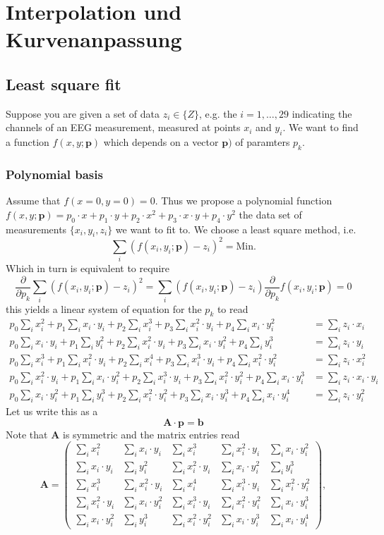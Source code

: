 \chapter{Interpolation und Kurvenanpassung}

\section{Least square fit}
Suppose you are given a set of data $z_i\in\{Z\}$, e.g. the $i=1,\dots,29$ indicating the channels of an EEG measurement, measured at points $x_i$ and $y_i$. We want to find a function $f(x,y;\mathbf{p})$ which depends on a vector $\mathbf{p})$ of paramters $p_k$. 
\subsection{Polynomial basis}
Assume that $f(x=0,y=0)=0$. Thus we propose a polynomial function $f(x,y;\mathbf{p})=p_0\cdot x+p_1\cdot y+p_2\cdot x^2+p_3\cdot x\cdot y+p_4\cdot y^2$ the data set of measurements $\{x_i,y_i,z_i\}$ we want to fit to. We choose a least square method, i.e.
\[
\sum_i \left( f(x_i,y_i;\mathbf{p})-z_i\right)^2 = \text{Min}.
\]
Which in turn is equivalent to require
\[
\frac{\partial}{\partial p_k}\sum_i \left( f(x_i,y_i;\mathbf{p})-z_i\right)^2=\sum_i \left( f(x_i,y_i;\mathbf{p})-z_i\right)\frac{\partial}{\partial p_k}f(x_i,y_i;\mathbf{p})=0
\]
this yields a linear system of equation for the $p_k$ to read
\begin{align*}
p_0\sum_i x_i^2+p_1\sum_i x_i\cdot y_i+p_2\sum_i x_i^3+p_3\sum_i x_i^2\cdot y_i+p_4\sum_i x_i\cdot y_i^2&=\sum_iz_i\cdot x_i\\
p_0\sum_i x_i\cdot y_i+p_1\sum_i y_i^2+p_2\sum_i x_i^2\cdot y_i+p_3\sum_i x_i\cdot y_i^2+p_4\sum_i y_i^3&=\sum_iz_i\cdot y_i\\
p_0\sum_i x_i^3+p_1\sum_i x_i^2\cdot y_i+p_2\sum_i x_i^4+p_3\sum_i x_i^3\cdot y_i+p_4\sum_i x_i^2\cdot y_i^2&=\sum_iz_i\cdot x_i^2\\
p_0\sum_i x_i^2\cdot y_i+p_1\sum_i x_i\cdot y_i^2+p_2\sum_i x_i^3\cdot y_i+p_3\sum_i x_i^2\cdot y_i^2+p_4\sum_i x_i\cdot y_i^3&=\sum_iz_i\cdot x_i\cdot y_i\\
p_0\sum_i x_i\cdot y_i^2+p_1\sum_i y_i^3+p_2\sum_i x_i^2\cdot y_i^2+p_3\sum_i x_i\cdot y_i^3+p_4\sum_i x_i\cdot y_i^4&=\sum_iz_i\cdot y_i^2
\end{align*}
Let us write this as a 
\[
\mathbf{A}\cdot\mathbf{p}=\mathbf{b}
\]
Note that $\mathbf{A}$ is symmetric and the matrix entries read
\[ 
\mathbf{A}=
\begin{pmatrix}
\sum_i x_i^2&\sum_i x_i\cdot y_i&\sum_i x_i^3&\sum_i x_i^2\cdot y_i&\sum_i x_i\cdot y_i^2\\
\sum_i x_i\cdot y_i&\sum_i y_i^2&\sum_i x_i^2\cdot y_i&\sum_i x_i\cdot y_i^2&\sum_i y_i^3\\
\sum_i x_i^3&\sum_i x_i^2\cdot y_i&\sum_i x_i^4&\sum_i x_i^3\cdot y_i&\sum_i x_i^2\cdot y_i^2\\
\sum_i x_i^2\cdot y_i&\sum_i x_i\cdot y_i^2&\sum_i x_i^3\cdot y_i&\sum_i x_i^2\cdot y_i^2&\sum_i x_i\cdot y_i^3\\
\sum_i x_i\cdot y_i^2&\sum_i y_i^3&\sum_i x_i^2\cdot y_i^2&\sum_i x_i\cdot y_i^3&\sum_i x_i\cdot y_i^4
\end{pmatrix},
\]
